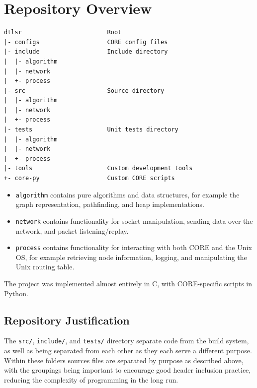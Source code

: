 \documentclass[withindex,glossary,openany]{cam-thesis}
\begin{document}
\section{Repository Overview}

\begin{minipage}{1\textwidth} \centering
\begin{lstlisting}[label=repository, frame=tb]
dtlsr                        Root
|- configs                   CORE config files
|- include                   Include directory
|  |- algorithm
|  |- network
|  +- process
|- src                       Source directory
|  |- algorithm
|  |- network
|  +- process
|- tests                     Unit tests directory
|  |- algorithm
|  |- network
|  +- process
|- tools                     Custom development tools
+- core-py                   Custom CORE scripts
\end{lstlisting}
\end{minipage}

\begin{itemize}
	\item
	\texttt{algorithm} contains pure algorithms and data structures, for example the graph representation, pathfinding, and heap implementations.

	\item
	\texttt{network} contains functionality for socket manipulation, sending data over the network, and packet listening/replay.
	
	\item
	\texttt{process} contains functionality for interacting with both CORE and the Unix OS, for example retrieving node information, logging, and manipulating the Unix routing table.
\end{itemize}

The project was implemented almost entirely in C, with CORE-specific scripts in Python.

\subsection{Repository Justification}

The \texttt{src/}, \texttt{include/}, and \texttt{tests/} directory separate code from the build system, as well as being separated from each other as they each serve a different purpose. Within these folders sources files are separated by purpose as described above, with the groupings being important to encourage good header inclusion practice, reducing the complexity of programming in the long run.
\end{document}
